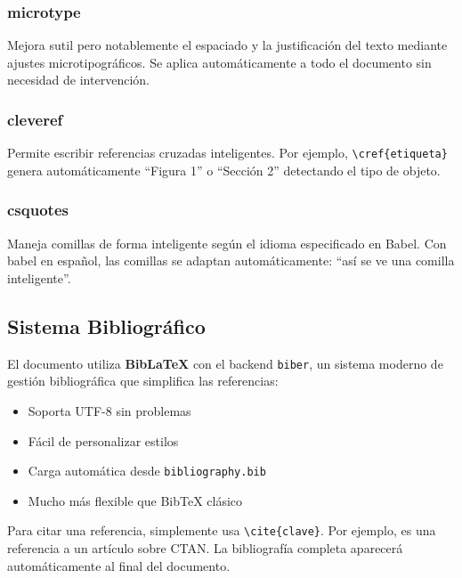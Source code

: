 \documentclass[/work/src/main.tex]{subfiles}
\begin{document}
\subsubsection{microtype}
Mejora sutil pero notablemente el espaciado y la justificación del texto mediante ajustes microtipográficos. Se aplica automáticamente a todo el documento sin necesidad de intervención.

\subsubsection{cleveref}
Permite escribir referencias cruzadas inteligentes. Por ejemplo, \texttt{\textbackslash cref\{etiqueta\}} genera automáticamente ``Figura 1'' o ``Sección 2'' detectando el tipo de objeto.

\subsubsection{csquotes}
Maneja comillas de forma inteligente según el idioma especificado en Babel. Con babel en español, las comillas se adaptan automáticamente: \enquote{así se ve una comilla inteligente}.

\subsection{Sistema Bibliográfico}
El documento utiliza \textbf{BibLaTeX} con el backend \texttt{biber}, un sistema moderno de gestión bibliográfica que simplifica las referencias:

\begin{itemize}
    \item Soporta UTF-8 sin problemas
    \item Fácil de personalizar estilos
    \item Carga automática desde \texttt{bibliography.bib}
    \item Mucho más flexible que BibTeX clásico
\end{itemize}

Para citar una referencia, simplemente usa \texttt{\textbackslash cite\{clave\}}. Por ejemplo, \cite{greenwade93} es una referencia a un artículo sobre CTAN. La bibliografía completa aparecerá automáticamente al final del documento.
\end{document}
